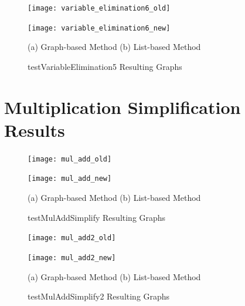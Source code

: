 \documentclass[12pt,openany,a4paper]{book}
\begin{document}
\begin{figure}[H]
    \begin{minipage}[l]{0.4\textwidth}
        \texttt{[image: variable\_elimination6\_old]}
    \end{minipage}
    \hspace{0.05\textwidth}
    \begin{minipage}[l]{0.6\textwidth}
        \texttt{[image: variable\_elimination6\_new]}
    \end{minipage}
    \hspace*{0.03\textwidth}
    (a) Graph-based Method
    \hspace{0.25\textwidth}
    (b) List-based Method
    \caption{testVariableElimination5 Resulting Graphs}
    \label{varelim5}
\end{figure}

\section{Multiplication Simplification Results}
\label{muladdres}

\begin{figure}[H]
    \begin{minipage}[l]{0.4\textwidth}
        \texttt{[image: mul\_add\_old]}
    \end{minipage}
    \hspace{0.05\textwidth}
    \begin{minipage}[l]{0.6\textwidth}
        \texttt{[image: mul\_add\_new]}
    \end{minipage}
    \hspace*{0.03\textwidth}
    (a) Graph-based Method
    \hspace{0.25\textwidth}
    (b) List-based Method
    \caption{testMulAddSimplify Resulting Graphs}
    \label{mulsimp}
\end{figure}

\begin{figure}[H]
    \begin{minipage}[l]{0.4\textwidth}
        \texttt{[image: mul\_add2\_old]}
    \end{minipage}
    \hspace{0.18\textwidth}
    \begin{minipage}[l]{0.4\textwidth}
        \texttt{[image: mul\_add2\_new]}
    \end{minipage}
    \hspace*{0.03\textwidth}
    (a) Graph-based Method
    \hspace{0.25\textwidth}
    (b) List-based Method
    \caption{testMulAddSimplify2 Resulting Graphs}
    \label{mulsimp2}
\end{figure}
\end{document}
